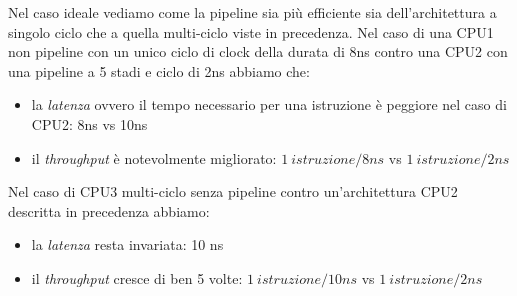 Nel caso ideale vediamo come la pipeline sia più efficiente sia dell'architettura a singolo ciclo che a quella multi-ciclo viste in precedenza.
Nel caso di una CPU1 non pipeline con un unico ciclo di clock della durata di 8ns contro una CPU2 con una pipeline a 5 stadi e ciclo di 2ns abbiamo che:
\begin{itemize}
\item la \emph{latenza} ovvero il tempo necessario per una istruzione è peggiore nel caso di CPU2: 8ns vs 10ns
\item il \emph{throughput} è notevolmente migliorato: $1 \ istruzione/8ns$ vs $1 \ istruzione/2ns$
\end{itemize}
Nel caso di CPU3 multi-ciclo senza pipeline contro un'architettura CPU2 descritta in precedenza abbiamo:
\begin{itemize}
\item la \emph{latenza} resta invariata: 10 ns
\item il \emph{throughput} cresce di ben 5 volte: $1 \ istruzione/10ns$ vs $1 \ istruzione/2ns$
\end{itemize}
